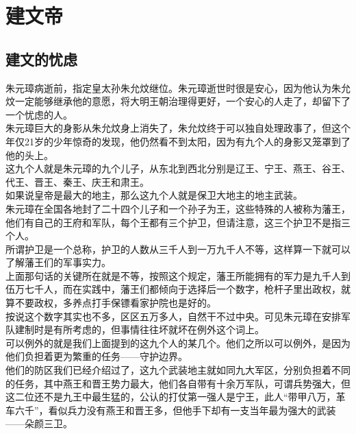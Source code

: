 \section{建文帝}
\ifnum{}
	\begin{multicols}{\theparacolNo}
\fi
\subsection{建文的忧虑}
朱元璋病逝前，指定皇太孙朱允炆继位。朱元璋逝世时很是安心，因为他认为朱允炆一定能够继承他的意愿，将大明王朝治理得更好，一个安心的人走了，却留下了一个忧虑的人。\\

朱元璋巨大的身影从朱允炆身上消失了，朱允炆终于可以独自处理政事了，但这个年仅21岁的少年惊奇的发现，他仍然看不到太阳，因为有九个人的身影又笼罩到了他的头上。\\

这九个人就是朱元璋的九个儿子，从东北到西北分别是辽王、宁王、燕王、谷王、代王、晋王、秦王、庆王和肃王。\\

如果说皇帝是最大的地主，那么这九个人就是保卫大地主的地主武装。\\

朱元璋在全国各地封了二十四个儿子和一个孙子为王，这些特殊的人被称为藩王，他们有自己的王府和军队，每个王都有三个护卫，但请注意，这三个护卫不是指三个人。\\

所谓护卫是一个总称，护卫的人数从三千人到一万九千人不等，这样算一下就可以了解藩王们的军事实力。\\

上面那句话的关键所在就是不等，按照这个规定，藩王所能拥有的军力是九千人到伍万七千人，而在实践中，藩王们都倾向于选择后一个数字，枪杆子里出政权，就算不要政权，多养点打手保镖看家护院也是好的。\\

按说这个数字其实也不多，区区五万多人，自然干不过中央。可见朱元璋在安排军队建制时是有所考虑的，但事情往往坏就坏在例外这个词上。\\

可以例外的就是我们上面提到的这九个人的某几个。他们之所以可以例外，是因为他们负担着更为繁重的任务——守护边界。\\

他们的防区我们已经介绍过了，这九个武装地主就如同九大军区，分别负担着不同的任务，其中燕王和晋王势力最大，他们各自带有十余万军队，可谓兵势强大，但这二位还不是九王中最生猛的，公认的打仗第一强人是宁王，此人“带甲八万，革车六千”，看似兵力没有燕王和晋王多，但他手下却有一支当年最为强大的武装——朵颜三卫。\\


\end{multicols}
